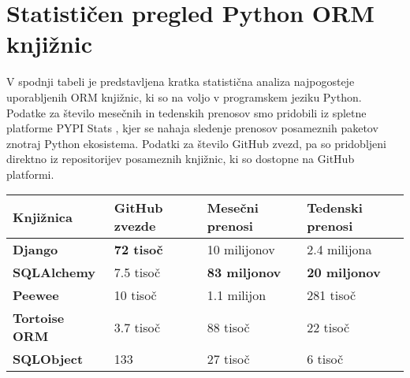 \documentclass[a4paper,12pt,openright]{book}
\begin{document}
    \section{Statističen pregled Python ORM knjižnic}

    V spodnji tabeli je predstavljena kratka statistična analiza najpogosteje uporabljenih ORM knjižnic, ki so na voljo v programskem jeziku Python. Podatke za število mesečnih in tedenskih prenosov smo pridobili iz spletne platforme PYPI Stats \cite{pypistats}, kjer se nahaja sledenje prenosov posameznih paketov znotraj Python ekosistema. Podatki za število GitHub zvezd, pa so pridobljeni direktno iz repositorijev posameznih knjižnic, ki so dostopne na GitHub platformi.
    
    \noindent
    \begin{center}
        \begin{tabular}{p{}|p{}|p{}|p{}}
          {\bf Knjižnica} & {\bf GitHub zvezde} & {\bf Mesečni prenosi} & {\bf Tedenski prenosi} \\ \hline
          {\bf Django \cite{DJANGO_GITHUB}} & \textbf{\num{72} tisoč} & \num{10} milijonov & \num{2,4} milijona \\
          {\bf SQLAlchemy \cite{SQLALCHEMY_GITHUB}} & \num{7,5} tisoč &  \textbf{\num{83} miljonov} & \textbf{\num{20} miljonov} \\
          {\bf Peewee \cite{PEEWEE_GITHUB}} & \num{10} tisoč & \num{1,1} milijon & \num{281} tisoč \\
          {\bf Tortoise ORM \cite{TORTOISE_GITHUB}} & \num{3,7} tisoč & \num{88} tisoč & \num{22} tisoč \\
          {\bf SQLObject \cite{SQLOBJECT_GITHUB}} & 133 & \num{27} tisoč & \num{6} tisoč \\
        \end{tabular}
    \end{center}
\end{document}

